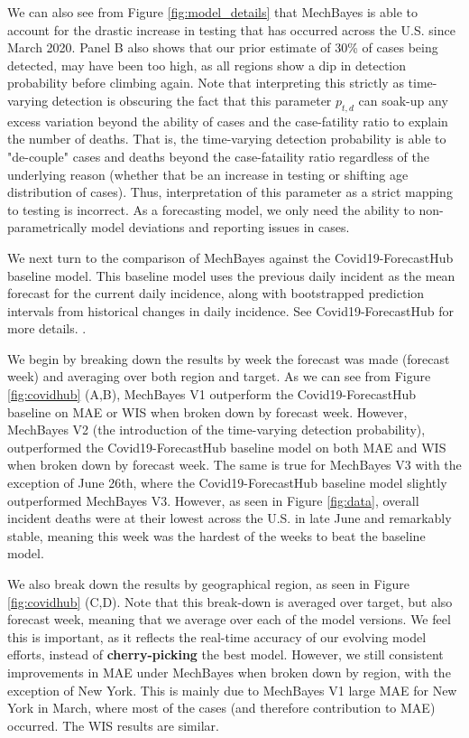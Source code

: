 \documentclass[11pt]{amsart}
\begin{document}
We can also see from Figure \ref{fig:model_details}  that MechBayes is able to account for the drastic increase in testing that has occurred across the U.S. since March 2020. Panel B also shows that our prior estimate of 30\% of cases being detected, may have been too high, as all regions show a dip in detection probability before climbing again. Note that interpreting this strictly as time-varying detection is obscuring the fact that this parameter $p_{t,d}$ can soak-up any excess variation beyond the ability of cases and the case-fatility ratio to explain the number of deaths. That is, the time-varying detection probability is able to "de-couple" cases and deaths beyond the case-fataility ratio regardless of the underlying reason (whether that be an increase in testing or shifting age distribution of cases). Thus, interpretation of this parameter as a strict mapping to testing is incorrect. As a forecasting model, we only need the ability to non-parametrically model deviations and reporting issues in cases.

We next turn to the comparison of MechBayes against the Covid19-ForecastHub baseline model. This baseline model uses the previous daily incident as the mean forecast for the current daily incidence, along with  bootstrapped prediction intervals from historical changes in daily incidence. See Covid19-ForecastHub for more details. \cite{covidhub}. 

We begin by breaking down the results by week the forecast was made (forecast week) and averaging over both region and target. As we can see from Figure \ref{fig:covidhub} (A,B), MechBayes V1 outperform the Covid19-ForecastHub baseline on MAE or WIS when broken down by forecast week. However, MechBayes V2 (the introduction of the time-varying detection probability), outperformed the Covid19-ForecastHub baseline model on both MAE and WIS when broken down by forecast week. The same is true for MechBayes V3 with the exception of June 26th, where the Covid19-ForecastHub baseline model slightly outperformed MechBayes V3. However, as seen in Figure \ref{fig:data}, overall incident deaths were at their lowest across the U.S. in late June and remarkably stable, meaning this week was the hardest of the weeks to beat the baseline model. 

We also break down the results by geographical region, as seen in Figure \ref{fig:covidhub} (C,D). Note that this break-down is averaged over target, but also forecast week, meaning that we average over each of the model versions. We feel this is important, as it reflects the real-time accuracy of our evolving model efforts, instead of \textbf{cherry-picking} the best model. However, we still consistent improvements in MAE under MechBayes when broken down by region, with the exception of New York. This is mainly due to MechBayes V1 large MAE for New York in March, where most of the cases (and therefore contribution to MAE) occurred. The WIS results are similar. 
\end{document}
